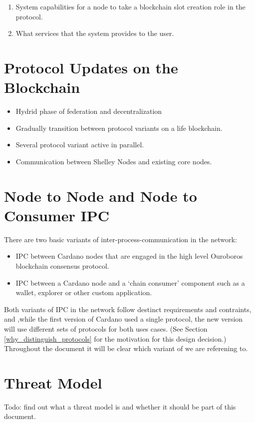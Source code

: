\documentclass{report}
\theoremstyle{definition}{
  \newtheorem{lemma}{Lemma}[section] %
  \newtheorem{definition}[lemma]{Definition}
}
\theoremstyle{theorem}{
  \newtheorem{invariant}[lemma]{Invariant}
  \newtheorem{proofobligation}[lemma]{Proof Obligation}
}
\numberwithin{equation}{lemma}
\begin{document}
\begin{enumerate}
\item System capabilities for a node to take a blockchain slot creation role in the protocol.
\item What services that the system provides to the user.
\end{enumerate}



\section{Protocol Updates on the Blockchain}
\begin{itemize}
\item Hydrid phase of federation and decentralization
\item Gradually transition between protocol variants on a life blockchain.
\item Several protocol variant active in parallel.
\item Communication between Shelley Nodes and existing core nodes.
\end{itemize}

\section{Node to Node and Node to Consumer IPC}
There are two basic variants of inter-process-communication in the network:
\begin{itemize}
\item IPC between Cardano nodes that are engaged in the high level Ouroboros
      blockchain consensus protocol.
\item IPC between a Cardano node and a `chain consumer' component such as a
      wallet, explorer or other custom application.
\end{itemize}
Both variants of IPC in the network follow destinct requirements and contraints, and
,while the first version of Cardano used a single protocol, the new version will
use different sets of protocols for both uses cases.
(See Section \ref{why_distinguish_protocols} for the motivation for this design decision.)
Throughout the document it will be clear which variant of we are referening to.

\section{Threat Model}
Todo: find out what a threat model is and whether it should be part of this document.
\end{document}
